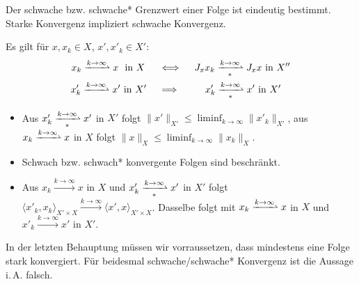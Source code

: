 \documentclass{cheat-sheet}
\newcommand{\IntO}[2]{\Int{\Omega}{}{#1}{#2}} %
\newcommand{\convWith}[1]{\xrightarrow{#1 \to \infty}} %
\newcommand{\convWeaklyWith}[1]{\xrightharpoonup{#1 \to \infty}} %
\newcommand{\convWeaklyStarWith}[1]{\xrightharpoonup[*]{#1 \to \infty}} %
\begin{document}
\begin{bem}
  Der schwache bzw. schwache* Grenzwert einer Folge ist eindeutig bestimmt. Starke Konvergenz impliziert schwache Konvergenz.
\end{bem}

\begin{satz}
  Es gilt für $x, x_k \in X$, $x', x'_k \in X'$:
  \begin{align*}
    x_k \convWeaklyWith{k} x \,\, \text{ in } X \, \quad &\iff \quad J_x x_k \convWeaklyStarWith{k} J_x x \text{ in } X'' \\
    x'_k \convWeaklyWith{k} x' \text{ in } X' \quad &\implies \qquad \,\, x'_k \convWeaklyStarWith{k} x' \text{ in } X'
  \end{align*}
\end{satz}

\begin{lem}
  \begin{itemize}
    \item Aus $x'_k \convWeaklyStarWith{k} x'$ in $X'$ folgt $\|x'\|_{X'} \leq \liminf_{k \to \infty} \|x'_k\|_{X'}$, aus $x_k \convWeaklyWith{k} x$ in $X$ folgt $\|x\|_X \leq \liminf_{k \to \infty} \|x_k\|_X$.
    \item Schwach bzw. schwach* konvergente Folgen sind beschränkt.
    \item Aus $x_k \convWith{k} x$ in $X$ und $x'_k \convWeaklyStarWith{k} x'$ in $X'$ folgt $\langle x'_k, x_k \rangle_{X' \times X} \convWith{k} \langle x', x \rangle_{X' \times X}$. Dasselbe folgt mit $x_k \convWeaklyWith{k} x$ in $X$ und $x'_k \convWith{k} x'$ in $X'$.
  \end{itemize}
\end{lem}

\begin{acht}
  In der letzten Behauptung müssen wir vorraussetzen, dass mindestens eine Folge stark konvergiert. Für beidesmal schwache/schwache* Konvergenz ist die Aussage i.\,A. falsch.
\end{acht}

\iffalse
\begin{bsp}
  \begin{itemize}
    \item Sei $1 \leq p < \infty$ und $\tfrac{1}{p} + \tfrac{1}{p'} = 1$ und $\omega \subset \R^n$ beschränkt. Dann gilt für $f, f_k \in L^p(\Omega)$:
    \[ f_k \convWeaklyWith{k} f \text{ in } L^p(\Omega) \iff \forall g \in L^p(\Omega) : \IntO{f_k \cdot \overline{g}}{x} \convWith{k} \IntO{f \cdot \overline{g}}{x} \]
    \item Sei $\Omega \subset \R^n$ boffen und beschränkt und $1 \leq p \leq \infty$, $m \in \N_{> 0}$. Für $u, u_k \in W^{m,p}(\Omega)$ gilt dann:
    \[ u_k \convWeaklyWith{k} u \text{ in } W^{m,p}(\Omega) \iff \forall s, |s| \leq m : \partial^s u_k \convWeaklyWith{k} \partial^s u \text{ in } L^p(\Omega) \]
  \end{itemize}
\end{bsp}
\fi
\end{document}
